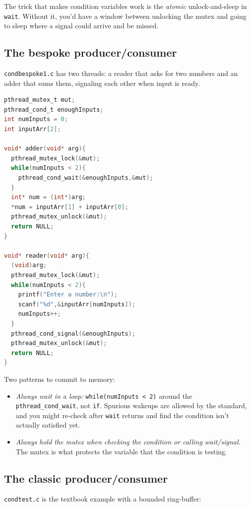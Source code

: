 \documentclass[11pt]{article}
\begin{document}
The trick that makes condition variables work is the \emph{atomic}
unlock-and-sleep in \texttt{wait}. Without it, you'd have a window
between unlocking the mutex and going to sleep where a signal could
arrive and be missed.

\subsection*{The bespoke producer/consumer}

\texttt{condbespoke1.c} has two threads: a reader that asks for two
numbers and an adder that sums them, signaling each other when input
is ready.

\begin{lstlisting}[language=C]
pthread_mutex_t mut;
pthread_cond_t enoughInputs;
int numInputs = 0;
int inputArr[2];

void* adder(void* arg){
  pthread_mutex_lock(&mut);
  while(numInputs < 2){
    pthread_cond_wait(&enoughInputs,&mut);
  }
  int* num = (int*)arg;
  *num = inputArr[1] + inputArr[0];
  pthread_mutex_unlock(&mut);
  return NULL;
}

void* reader(void* arg){
  (void)arg;
  pthread_mutex_lock(&mut);
  while(numInputs < 2){
    printf("Enter a number:\n");
    scanf("%d",&inputArr[numInputs]);
    numInputs++;
  }
  pthread_cond_signal(&enoughInputs);
  pthread_mutex_unlock(&mut);
  return NULL;
}
\end{lstlisting}

Two patterns to commit to memory:
\begin{itemize}
  \item \emph{Always wait in a loop:} \texttt{while(numInputs < 2)}
    around the \texttt{pthread\_cond\_wait}, not \texttt{if}.
    Spurious wakeups are allowed by the standard, and you might
    re-check after \texttt{wait} returns and find the condition
    isn't actually satisfied yet.
  \item \emph{Always hold the mutex when checking the condition or
    calling wait/signal.} The mutex is what protects the variable
    that the condition is testing.
\end{itemize}

\subsection*{The classic producer/consumer}

\texttt{condtest.c} is the textbook example with a bounded
ring-buffer:
\end{document}
